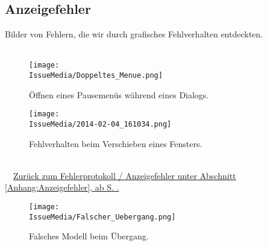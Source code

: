 %



\clearpage


	
	
\subsection*{Anzeigefehler}

Bilder von Fehlern, die wir durch grafisches Fehlverhalten entdeckten.\\~\\


%
%	
%	
%


\begin{figure}[ht]

	\centering
	\label{Anhang:Grafikfehler:Dialog_Pause}
	
	\texttt{[image: \\IssueMedia/Doppeltes\_Menue.png]}
	
	\caption{Öffnen eines Pausemenüs während eines Dialogs.}

\end{figure}

\begin{figure}[ht]

	\centering
	\label{Anhang:Grafikfehler:Fenster_Schieben}
	
	\texttt{[image: \\IssueMedia/2014-02-04\_161034.png]}
	
	\caption{Fehlverhalten beim Verschieben eines Fensters.}

\end{figure}



~\\~\mousecursor~\hyperref[Anhang:Anzeigefehler]{Zurück zum Fehlerprotokoll / Anzeigefehler unter Abschnitt \ref{Anhang:Anzeigefehler}, ab S. \pageref{Anhang:Anzeigefehler}.}


\clearpage



\begin{figure}[ht!]

	\centering
	\label{Anhang:Grafikfehler:Falscher_Uebergang}
	
	\texttt{[image: \\IssueMedia/Falscher\_Uebergang.png]}
	
	\caption{Falsches Modell beim Übergang.}

\end{figure}


